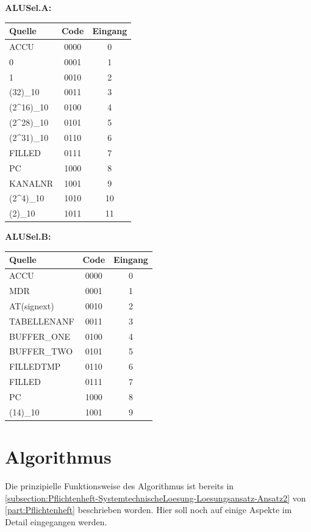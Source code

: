 \textbf{ALUSel.A:}

\begin{tabular}{lcc}
    Quelle               & Code & Eingang \\
    \hline
    ACCU                 & 0000 &  0 \\
    0                    & 0001 &  1 \\
    1                    & 0010 &  2 \\
    (32)_{10}            & 0011 &  3 \\
    (2^{16})_{10}        & 0100 &  4 \\
    (2^{28})_{10}        & 0101 &  5 \\
    (2^{31})_{10}        & 0110 &  6 \\
    FILLED               & 0111 &  7 \\
    PC                   & 1000 &  8 \\
    KANALNR              & 1001 &  9 \\
    (2^4)_{10}           & 1010 & 10 \\
    (2)_{10}             & 1011 & 11 \\
\end{tabular}

\textbf{ALUSel.B:}

\begin{tabular}{lcc}
    Quelle        & Code & Eingang \\
    \hline
    ACCU          & 0000 &  0 \\
    MDR           & 0001 &  1 \\
    AT(signext)   & 0010 &  2 \\
    TABELLENANF   & 0011 &  3 \\
    BUFFER\_ONE   & 0100 &  4 \\
    BUFFER\_TWO   & 0101 &  5 \\
    FILLEDTMP     & 0110 &  6 \\
    FILLED        & 0111 &  7 \\
    PC            & 1000 &  8 \\
    (14)_{10}     & 1001 &  9 \\
\end{tabular}

\section{Algorithmus}
\label{section:Dokumentation-Implementierung-Algorithmus}

Die prinzipielle Funktionsweise des Algorithmus ist bereits in \autoref{subsection:Pflichtenheft-SystemtechnischeLoesung-Loesungsansatz-Ansatz2} von \autoref{part:Pflichtenheft} beschrieben worden. Hier soll noch auf einige Aspekte im Detail eingegangen werden.


